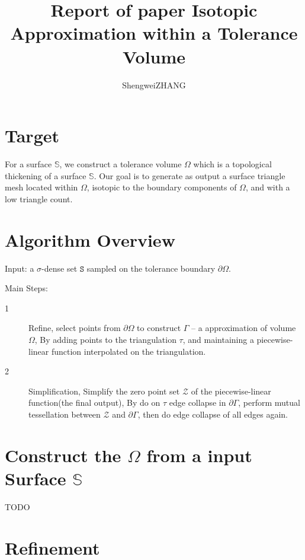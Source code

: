 \documentclass{article}
\title{Report of paper Isotopic Approximation within a Tolerance Volume}
\author{ShengweiZHANG\\
}
\theoremstyle{definition}
\theoremstyle{remark}
\begin{document}
\maketitle

\section{Target}
For a surface $\mathbb{S}$, we construct a tolerance volume $\Omega$ which is a topological thickening of a surface $\mathbb{S}$. Our goal is to generate as output a surface triangle mesh located within $\Omega$, isotopic to the boundary components of $\Omega$, and with a low triangle count.
\section{Algorithm Overview}
Input: a $\sigma$-dense set $\mathtt{S}$ sampled on the tolerance boundary $\partial \Omega$.\par
Main Steps:
\begin{description}
  \item[1] Refine, select points from $\partial \Omega$ to construct $\Gamma$ -- a approximation of volume $\Omega$, By adding points to the triangulation $\tau$, and maintaining a piecewise-linear function interpolated on the triangulation.
  \item[2] Simplification, Simplify the zero point set $\mathcal{Z}$ of the piecewise-linear function(the final output), By do on $\tau$ edge collapse in $\partial \Gamma$, perform mutual tessellation between $\mathcal{Z}$ and $\partial \Gamma$, then do edge collapse of all edges again.
\end{description}

\section{Construct the $\Omega$ from a input Surface $\mathbb{S}$}
TODO
\section{Refinement}
\end{document}
